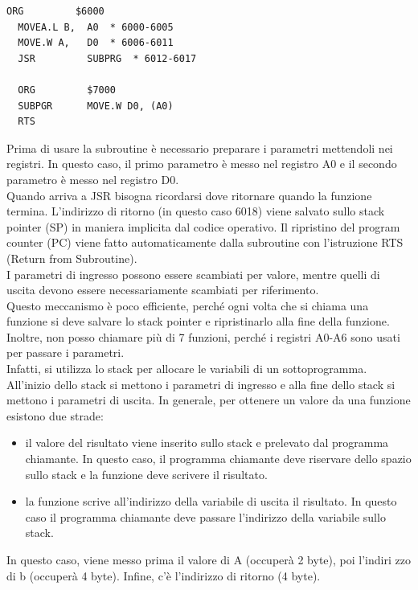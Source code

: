 \documentclass{article}
\begin{document}
\begin{lstlisting}[caption={Copia a in b},language={[Motorola68k]Assembler}]
  ORG         $6000
  MOVEA.L B,  A0  * 6000-6005
  MOVE.W A,   D0  * 6006-6011
  JSR         SUBPRG  * 6012-6017 

  ORG         $7000
  SUBPGR      MOVE.W D0, (A0)
  RTS
\end{lstlisting}

Prima di usare la subroutine è necessario preparare i parametri mettendoli nei 
registri.
In questo caso, il primo parametro è messo nel registro A0 e il secondo 
parametro è messo nel registro D0.\\

Quando arriva a JSR bisogna ricordarsi dove ritornare quando la funzione termina.
L'indirizzo di ritorno (in questo caso 6018) viene salvato sullo stack pointer 
(SP)
in maniera implicita dal codice operativo. Il ripristino del program counter 
(PC) viene fatto automaticamente
dalla subroutine con l'istruzione RTS (Return from Subroutine).\\
I parametri di ingresso possono essere scambiati per valore, mentre quelli di 
uscita
devono essere necessariamente scambiati per riferimento.\\

Questo meccanismo è poco efficiente, perché ogni volta che si chiama una 
funzione
si deve salvare lo stack pointer e ripristinarlo alla fine della funzione. 
Inoltre,
non posso chiamare più di 7 funzioni, perché i registri A0-A6 sono usati per 
passare i parametri.\\

Infatti, si utilizza lo stack per allocare le variabili di un sottoprogramma.
All'inizio dello stack si mettono i parametri di ingresso e alla fine dello 
stack si mettono i parametri di uscita. In generale, per ottenere un valore da 
una funzione esistono due strade:
\begin{itemize}
  \item il valore del risultato viene inserito sullo stack e prelevato dal 
    programma chiamante. In questo caso, il programma chiamante deve riservare 
    dello spazio sullo stack e la funzione deve scrivere il risultato.
  \item la funzione scrive all'indirizzo della variabile di uscita il risultato.
    In questo caso il programma chiamante deve passare l'indirizzo della 
    variabile sullo stack.
\end{itemize}

In questo caso, viene messo prima il valore di A (occuperà 2 byte), poi l'indiri
zzo 
di b (occuperà 4 byte). Infine, c'è l'indirizzo di ritorno (4 byte).\\
\end{document}
